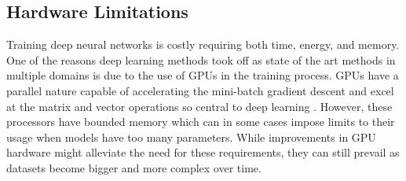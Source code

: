     
    
    \subsection{Hardware Limitations}
    Training deep neural networks is costly requiring both time, energy, and memory. One of the reasons deep learning methods took off as state of the art methods in multiple domains is due to the use of \ac{GPU}s in the training process. \ac{GPU}s have a parallel nature capable of accelerating the mini-batch gradient descent and excel at the matrix and vector operations so central to deep learning \cite{Ching2018}. However, these processors have bounded memory which can in some cases impose limits to their usage when models have too many parameters. While improvements in GPU hardware might alleviate the need for these requirements, they can still prevail as datasets become bigger and more complex over time. \par
    
